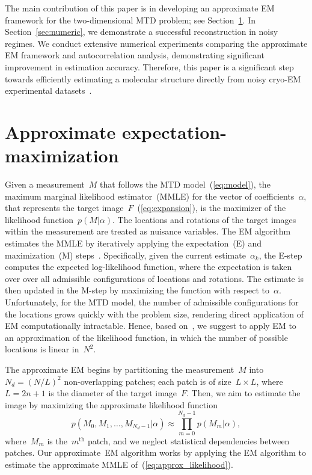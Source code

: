 \documentclass{article}
\begin{document}
The main contribution of this paper is in developing an approximate EM framework for the two-dimensional MTD problem; see Section~\ref{sec:EM}. In Section~\ref{sec:numeric}, we demonstrate a successful reconstruction in noisy regimes. We conduct extensive numerical experiments comparing the approximate EM framework and autocorrelation analysis, demonstrating significant improvement in estimation accuracy. Therefore, this paper is a significant step towards efficiently estimating a molecular structure directly from noisy \mbox{cryo-EM} experimental datasets~\cite{bendory2018toward}.

\section{Approximate expectation-maximization}
\label{sec:EM}
Given a measurement~$M$ that follows the MTD model~(\ref{eq:model}), the maximum marginal likelihood estimator~(MMLE) for the vector of coefficients~$\alpha$, that represents the target image~$F$~(\ref{eq:expansion}), is the maximizer of the likelihood function~$p(M | \alpha)$. The locations and rotations of the target images within the measurement are treated as nuisance variables. The EM algorithm estimates the MMLE by iteratively applying the expectation~(E) and maximization~(M) steps~\cite{dempster1977maximum}. Specifically, given the current estimate~$\alpha_k$, the \mbox{E-step} computes the expected log-likelihood function, where the expectation is taken over over all admissible configurations of locations and rotations. The estimate is then updated in the \mbox{M-step} by maximizing the function with respect to~$\alpha$. Unfortunately, for the MTD model, the number of admissible configurations for the locations grows quickly with the problem size, rendering direct application of EM computationally intractable. Hence, based on~\cite{lan2020multi}, we suggest to apply EM to an approximation of the likelihood function, in which the number of possible locations is linear in~$N^2$.

The approximate EM begins by partitioning the measurement~$M$ into~$N_d = (N / L)^2$ \mbox{non-overlapping} patches; each patch is of size~\mbox{$L \times L$}, where~\mbox{$L = 2n + 1$} is the diameter of the target image~$F$. Then, we aim to estimate the image by maximizing the approximate likelihood function
\begin{equation}
\label{eq:approx_likelihood}
p(M_0, M_1, \ldots, M_{N_d-1}|\alpha) \approx \prod_{m = 0}^{N_d - 1} p(M_m|\alpha),
\end{equation}
where~$M_m$ is the~$m^{\text{th}}$ patch, and we neglect statistical dependencies between patches. Our approximate~EM algorithm works by applying the EM algorithm to estimate the approximate MMLE of~(\ref{eq:approx_likelihood}).
\end{document}
